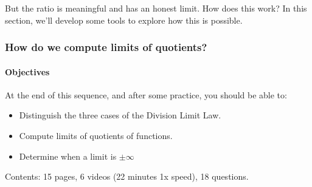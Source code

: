 \documentclass[pdftex, brazil, 12pt, twoside]{article}
\begin{document}
\begin{figure}[H]
  \begin{center}
  \end{center}
\end{figure}

But the ratio is meaningful and has an honest limit.
How does this work?
In this section, we'll develop some tools to explore
how this is possible.

\subsubsection{How do we compute limits of quotients?}
\label{u0-lim-quo-how-compute}

\paragraph{Objectives} At the end of this sequence, and after some practice, you should be able to:
\begin{itemize}[noitemsep]
\item Distinguish the three cases of the Division Limit Law.
\item Compute limits of quotients of functions.
\item Determine when a limit is $\pm \infty$
\end{itemize}

Contents: 15 pages, 6 videos (22 minutes 1x speed), 18 questions.

\end{document}
